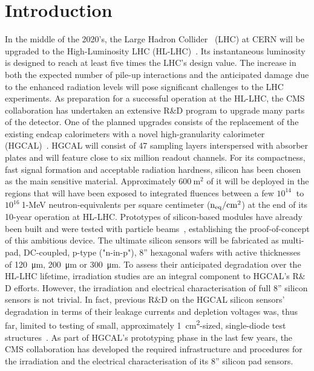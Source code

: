 \section{Introduction}
\label{sec:introduction}
In the middle of the 2020's, the Large Hadron Collider~\cite{evans:2008} (LHC) at CERN will be upgraded to the High-Luminosity LHC (HL-LHC)~\cite{hl-lhc-tdr:2017}.
Its instantaneous luminosity is designed to reach at least five times the LHC's design value.
The increase in both the expected number of pile-up interactions and the anticipated damage due to the enhanced radiation levels will pose significant challenges to the LHC experiments.
As preparation for a successful operation at the HL-LHC, the CMS~\cite{cms:2008} collaboration has undertaken an extensive R$\&$D program to upgrade many parts of the detector.
One of the planned upgrades consists of the replacement of the existing endcap calorimeters with a novel high-granularity calorimeter (HGCAL)~\cite{hgcal-tdr:2018}.
HGCAL will consist of 47 sampling layers interspersed with absorber plates and will feature close to six million readout channels.
For its compactness, fast signal formation and acceptable radiation hardness, silicon has been chosen as the main sensitive material.
Approximately $\SI{600}{\metre\squared}$ of it will be deployed in the regions that will have been exposed to integrated fluences between a few $10^{14}~$ to $10^{16}~$1-MeV neutron-equivalents per square centimeter ($\mathrm{n_{eq}}/\mathrm{cm}^{2}$) at the end of its 10-year operation at HL-LHC. 
Prototypes of silicon-based modules have already been built and were tested with particle beams~\cite{cms_hgc-2016-beamtests,H1:2020,H2:2020,H3:2021}, establishing the proof-of-concept of this ambitious device.
The ultimate silicon sensors will be fabricated as multi-pad, DC-coupled, p-type ("n-in-p"), 8'' hexagonal wafers with active thicknesses of \SI{120}{\micro\metre}, \SI{200}{\micro\metre} or \SI{300}{\micro\metre}.
To assess their anticipated degradation over the HL-LHC lifetime, irradiation studies are an integral component to HGCAL's R$\&$D efforts.
However, the irradiation and electrical characterisation of full 8'' silicon sensors is not trivial.
In fact, previous R$\&$D on the HGCAL silicon sensors' degradation in terms of their leakage currents and depletion voltages was, thus far, limited to testing of small, approximately \SI{1}{\centi\metre\squared}-sized, single-diode test structures~\cite{Curr_s_2017,Akchurin:2020}.
As part of HGCAL's prototyping phase in the last few years, the CMS collaboration has developed the required infrastructure and procedures for the irradiation and the electrical characterisation of its 8'' silicon pad sensors.
